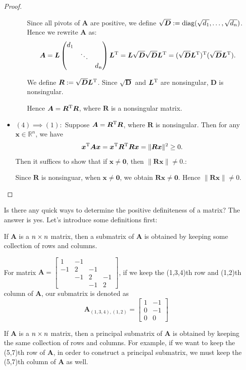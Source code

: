 \begin{proof}
\begin{itemize}
\begin{itemize}
Since all pivots of $\bm A$ are positive, we define $\sqrt{\bm D}:=\operatorname{diag}(\sqrt{d_1},\dots,\sqrt{d_n})$.\\
Hence we rewrite $\bm A$ as:
\[
\bm A=\bm L\begin{pmatrix}
d_1&&\\&\ddots&\\&&d_n
\end{pmatrix}\bm L^{\mathrm T}=\bm L\sqrt{\bm D}\sqrt{\bm D}\bm L^{\mathrm T}=(\sqrt{\bm D}\bm L^{\mathrm T})^{\mathrm T}(\sqrt{\bm D}\bm L^{\mathrm T}).
\]

We define $\bm R:=\sqrt{\bm D}\bm L^{\mathrm T}$. Since $\sqrt{\bm D}$ and $\bm L^{\mathrm T}$ are nonsingular, $\bm D$ is nonsingular.

Hence $\bm A=\bm R^{\mathrm T}\bm R$, where $\bm R$ is a  nonsingular matrix.
\end{itemize}
\item
$(4)\implies(1): $
Suppose $\bm A=\bm R^{\mathrm T}\bm R$, where $\bm R$ is nonsingular. Then for any $\bm x\in\mathbb{R}^{n}$, we have
\[
\bm x^{\mathrm T}\bm A\bm x=\bm x^{\mathrm T}\bm R^{\mathrm T}\bm R\bm x=\|\bm{Rx}\|^2\ge0.
\]
Then it suffices to show that if $\bm x\ne\bm0$, then $\|\bm{Rx}\|\ne0.$:

Since $\bm R$ is nonsinguar, when $\bm x\ne\bm 0$, we obtain $\bm{Rx}\ne\bm0.$ Hence $\|\bm{Rx}\|\ne0.$
\end{itemize}
\end{proof}
Is there any quick ways to determine the positive definiteness of a matrix? The answer is yes. Let's introduce some definitions first:
\begin{definition}[Submatrix]
If $\bm A$ is a $n\times n$ matrix, then a submatrix of $\bm A$ is obtained by keeping some collection of rows and columns.
\end{definition}
\begin{example}
For matrix $\bm A=\begin{bmatrix}
1&-1&&\\-1&2&-1&\\&-1&2&-1\\&&-1&2
\end{bmatrix}$, if we keep the (1,3,4)th row and (1,2)th column of $\bm A$, our submatrix is denoted as
\[
\bm A_{(1,3,4),(1,2)}=\begin{bmatrix}
1&-1\\0&-1\\0&0
\end{bmatrix}
\]
\end{example}
\begin{definition}
If $\bm A$ is a $n\times n$ matrix, then a principal submatrix of $\bm A$ is obtained by keeping the same collection of rows and columns. For example, if we want to keep the (5,7)th row of $\bm A$, in order to construct a principal submatrix, we must keep the (5,7)th column of $\bm A$ as well.
\end{definition}

